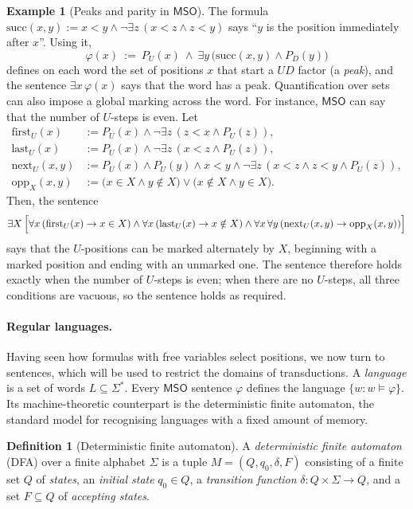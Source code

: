 \documentclass[11pt]{article}
\theoremstyle{definition}
\newtheorem{definition}[theorem]{Definition}
\newtheorem{example}[theorem]{Example}
\newcommand{\MSO}{\mathsf{MSO}}
\begin{document}
\begin{example}[Peaks and parity in $\MSO$]\label{ex:mso-peak}
The formula $\mathrm{succ}(x,y):=x<y\wedge\neg\exists z\,(x<z\wedge z<y)$ says
``$y$ is the position immediately after $x$''.  Using it,
\[
   \varphi(x)\ :=\ P_U(x)\ \wedge\ \exists y\,\bigl(\mathrm{succ}(x,y)\wedge P_D(y)\bigr)
\]
defines on each word the set of positions $x$ that start a $UD$ factor (a
\emph{peak}), and the sentence $\exists x\,\varphi(x)$ says that the word has a
peak.  Quantification over sets can also impose a global marking across the
word.  For instance, $\MSO$ can say that the number of $U$-steps is even.  Let
\[
\begin{aligned}
   \mathrm{first}_U(x)&:=P_U(x)\wedge\neg\exists z\,(z<x\wedge P_U(z)),\\
   \mathrm{last}_U(x)&:=P_U(x)\wedge\neg\exists z\,(x<z\wedge P_U(z)),\\
   \mathrm{next}_U(x,y)&:=P_U(x)\wedge P_U(y)\wedge x<y
      \wedge\neg\exists z\,(x<z\wedge z<y\wedge P_U(z)),\\
   \mathrm{opp}_X(x,y)&:=
   \bigl(x\in X\wedge y\notin X\bigr)
   \vee
   \bigl(x\notin X\wedge y\in X\bigr).
\end{aligned}
\]
Then, the sentence
\[
\exists X\,\Bigl[
   \forall x\,(\mathrm{first}_U(x)\rightarrow x\in X)
   \wedge
   \forall x\,(\mathrm{last}_U(x)\rightarrow x\notin X)
   \wedge
   \forall x\,\forall y\,(\mathrm{next}_U(x,y)\rightarrow
      \mathrm{opp}_X(x,y))
\Bigr]
\]
says that the $U$-positions can be marked alternately by $X$, beginning with a
marked position and ending with an unmarked one.  The sentence therefore holds
exactly when the number of $U$-steps is even; when there are no $U$-steps, all
three conditions are vacuous, so the sentence holds as required.
\end{example}

\paragraph{Regular languages.}
Having seen how formulas with free variables select positions, we now turn to
sentences, which will be used to restrict the domains of transductions.  A
\emph{language} is a set of words $L\subseteq\Sigma^*$.  Every $\MSO$ sentence
$\varphi$ defines the language $\{w:w\models\varphi\}$.  Its machine-theoretic
counterpart is the deterministic finite automaton, the standard model for
recognising languages with a fixed amount of memory.

\begin{definition}[Deterministic finite automaton]\label{def:dfa}
A \emph{deterministic finite automaton} (DFA) over a finite alphabet $\Sigma$ is
a tuple $M=(Q,q_0,\delta,F)$ consisting of a finite set $Q$ of \emph{states}, an
\emph{initial state} $q_0\in Q$, a \emph{transition function}
$\delta\colon Q\times\Sigma\to Q$, and a set $F\subseteq Q$ of \emph{accepting
states}.
\end{definition}
\end{document}
